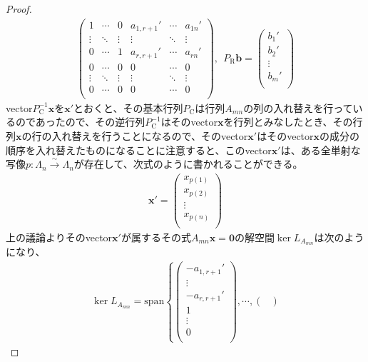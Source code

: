 \documentclass[dvipdfmx]{jsarticle}
\begin{document}
\begin{proof}
\begin{align*}
\begin{pmatrix}
1 & \cdots & 0 & a_{1,r + 1}' & \cdots & a_{1n}' \\
 \vdots & \ddots & \vdots & \vdots & \ddots & \vdots \\
0 & \cdots & 1 & a_{r,r + 1}' & \cdots & a_{rn}' \\
0 & \cdots & 0 & 0 & \cdots & 0 \\
 \vdots & \ddots & \vdots & \vdots & \ddots & \vdots \\
0 & \cdots & 0 & 0 & \cdots & 0 \\
\end{pmatrix},\ \ P_{\mathrm{R}}\mathbf{b} = \begin{pmatrix}
b_{1}' \\
b_{2}' \\
 \vdots \\
b_{m}' \\
\end{pmatrix}
\end{align*}
vector$P_{\mathrm{C}}^{- 1}\mathbf{x}$を$\mathbf{x}'$とおくと、その基本行列$P_{\mathrm{C}}$は行列$A_{mn}$の列の入れ替えを行っているのであったので、その逆行列$P_{\mathrm{C}}^{- 1}$はそのvector$\mathbf{x}$を行列とみなしたとき、その行列$\mathbf{x}$の行の入れ替えを行うことになるので、そのvector$\mathbf{x}'$はそのvector$\mathbf{x}$の成分の順序を入れ替えたものになることに注意すると、このvector$\mathbf{x}'$は、ある全単射な写像$p:\varLambda_{n}\overset{\sim}{\rightarrow}\varLambda_{n}$が存在して、次式のように書かれることができる。
\begin{align*}
\mathbf{x}' = \begin{pmatrix}
x_{p(1)} \\
x_{p(2)} \\
 \vdots \\
x_{p(n)} \\
\end{pmatrix}
\end{align*}
上の議論よりそのvector$\mathbf{x}'$が属するその式$A_{mn}\mathbf{x} = \mathbf{0}$の解空間$\ker L_{A_{mn}}$は次のようになり、
\begin{align*}
\ker L_{A_{mn}} = {\mathrm{span} }\left\{ \begin{pmatrix}
 - a_{1,r + 1}' \\
 \vdots \\
 - a_{r,r + 1}' \\
1 \\
 \vdots \\
0 \\
\end{pmatrix},\cdots,\begin{pmatrix}

\end{pmatrix}
\end{align*}
\end{proof}
\end{document}

